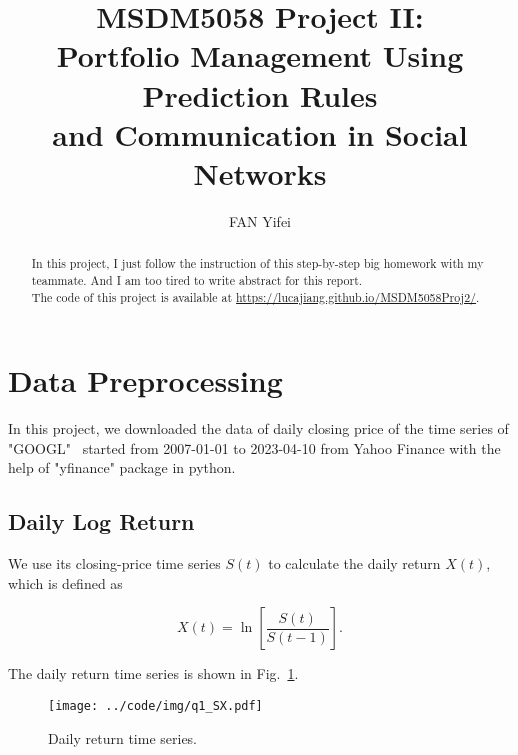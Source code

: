 \documentclass[runningheads]{llncs}
\begin{document}
\title{MSDM5058 Project II:\\
    Portfolio Management Using Prediction Rules\\
    and Communication in Social Networks}
%
%
\author{FAN Yifei}
%
%
%
\maketitle              %
%
\begin{abstract}
    In this project, I just follow the instruction of this step-by-step big homework with my teammate. And I am too tired to write abstract for this report.\\
    The code of this project is available at \url{https://lucajiang.github.io/MSDM5058Proj2/}.
\end{abstract}

\section{Data Preprocessing}\label{sec:1}

In this project, we downloaded the data of
daily closing price of the time series of "GOOGL"~\cite{goolge}
started from 2007-01-01 to 2023-04-10 from Yahoo Finance with the help of "yfinance"\cite{yfinance} package in python.

\subsection{Daily Log Return}

We use its closing-price time series $S(t)$ to calculate the daily return $X(t)$, which is defined as

\begin{equation}
    X(t)=\ln \left[\frac{S(t)}{S(t-1)}\right].
\end{equation}

The daily return time series is shown in Fig.~\ref{fig:q1sx}.

\begin{figure}[!htbp]
    \begin{center}
        \texttt{[image: ../code/img/q1\_SX.pdf]}
    \end{center}
    \caption{Daily return time series.}
    \label{fig:q1sx}
\end{figure}
\end{document}
